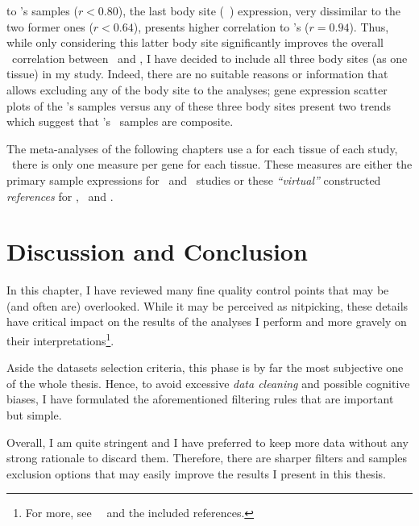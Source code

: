 \begin{itemize}[topsep=0pt,nosep]
            to \uhlen{}'s  samples ($r < 0.80$),
            the last body site (\ie\ ) expression,
            very dissimilar to the two former ones ($r < 0.64$),
            presents higher correlation to \uhlen's ($r = 0.94$).
            Thus, while only considering this latter body site significantly improves
            the overall \oesophagus\ correlation between \gtex\ and \uhlen,
            I have decided to include all three body sites (as one tissue)
            in my study.
            Indeed, there are no suitable reasons or information that allows excluding
            any of the body site  to the analyses;
            gene expression scatter plots of the \uhlen{}'s samples versus
            any of these three body sites present two trends which suggest that
            \uhlen{}'s \oesophagus\ samples are composite.

\end{itemize}

\label{def:trep}
The meta-analyses of the following chapters use
a  for each tissue of each study, \ie\
there is only one measure per gene for each tissue.
These measures are either
the primary sample expressions for \castle\ and \ibm\ studies or
these \emph{\enquote{virtual}} constructed \emph{references}
for \brawand, \uhlen\ and \gtex.



\section{Discussion and Conclusion}

In this chapter, I have reviewed many fine quality control points that
may be (and often are) overlooked.
While it may be perceived as nitpicking,
these details have critical impact on the results of the analyses
I perform and more gravely on their interpretations\footnote{%
For more, see~~
and the included references.}.

Aside the datasets selection criteria,
this phase is by far the most subjective one of the whole thesis.
Hence, to avoid excessive \emph{data cleaning}
and possible cognitive biases,
I have formulated the aforementioned filtering rules
that are important but simple.

Overall, I am quite stringent and I have preferred to keep more data
without any strong rationale to discard them.
Therefore, there are sharper filters and samples exclusion options that
may easily improve the results I present in this thesis.


